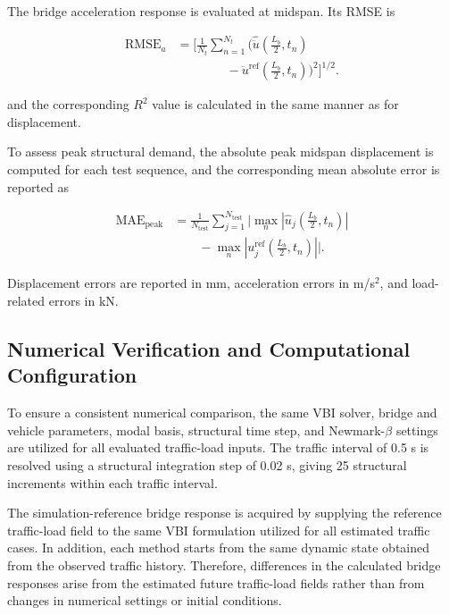 \documentclass[journal]{IEEEtran}
\begin{document}
The
bridge acceleration response is evaluated at midspan. Its RMSE is

\begin{equation}
\begin{aligned}
\mathrm{RMSE}_{a}
&=
\Bigg[
\frac{1}{N_t}
\sum_{n=1}^{N_t}
\Bigg(
\widehat{\ddot{u}}
\left(
\frac{L_b}{2},t_n
\right)
\\
&\qquad\qquad
-
\ddot{u}^{\mathrm{ref}}
\left(
\frac{L_b}{2},t_n
\right)
\Bigg)^2
\Bigg]^{1/2}.
\end{aligned}
\end{equation}

and
the corresponding $R^2$ value is calculated in
the same manner as for displacement.

To
assess peak structural demand, the absolute peak midspan displacement is
computed for each test sequence, and the corresponding mean absolute error is
reported as

\begin{equation}
\begin{aligned}
\mathrm{MAE}_{\mathrm{peak}}
&=
\frac{1}{N_{\mathrm{test}}}
\sum_{j=1}^{N_{\mathrm{test}}}
\Bigg|
\max_{n}
\left|
\widehat{u}_{j}
\left(
\frac{L_b}{2},t_n
\right)
\right|
\\
&\qquad
-
\max_{n}
\left|
u_{j}^{\mathrm{ref}}
\left(
\frac{L_b}{2},t_n
\right)
\right|
\Bigg|.
\end{aligned}
\end{equation}

Displacement
errors are reported in mm, acceleration errors in m/s$^2$, and load-related errors
in kN.




\subsection{Numerical Verification and Computational Configuration}

To
ensure a consistent numerical comparison, the same VBI solver, bridge and
vehicle parameters, modal basis, structural time step, and Newmark-$\beta$
settings are utilized for all evaluated
traffic-load inputs. The traffic interval of 0.5 s is resolved using a
structural integration step of 0.02 s, giving 25 structural increments within
each traffic interval.

The
simulation-reference bridge response is acquired by supplying the reference
traffic-load field to the same VBI formulation utilized for all estimated
traffic cases. In addition, each method starts from the same dynamic state
obtained from the observed traffic history. Therefore, differences in the
calculated bridge responses arise from the estimated future traffic-load fields
rather than from changes in numerical settings or initial conditions.
\end{document}
